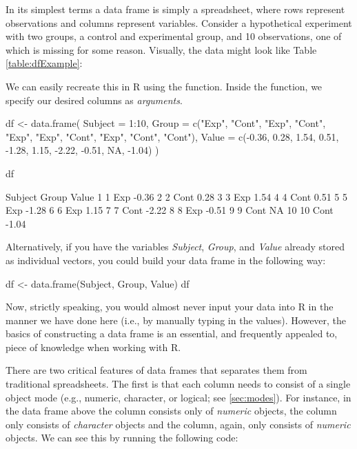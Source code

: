 In its simplest terms a data frame is simply a spreadsheet, where rows represent observations and columns represent variables. Consider a hypothetical experiment with two groups, a control and experimental group, and 10 observations, one of which is missing for some reason. Visually, the data might look like Table \ref{table:dfExample}: 

\medskip



\noindent
We can easily recreate this in R using the  function. Inside the function, we specify our desired columns as \textit{arguments}.

\begin{inR}
df <- data.frame(
  Subject = 1:10,
  Group = c("Exp", "Cont", "Exp", "Cont", "Exp", "Exp",
            "Cont", "Exp", "Cont", "Cont"),
  Value = c(-0.36,  0.28,  1.54,  0.51, -1.28,  1.15,
            -2.22, -0.51,  NA, -1.04)
)

df
\end{inR}
\begin{outR}
   Subject Group Value
1        1   Exp -0.36
2        2  Cont  0.28
3        3   Exp  1.54
4        4  Cont  0.51
5        5   Exp -1.28
6        6   Exp  1.15
7        7  Cont -2.22
8        8   Exp -0.51
9        9  Cont    NA
10      10  Cont -1.04
\end{outR}

\noindent
Alternatively, if you have the variables \textit{Subject}, \textit{Group}, and \textit{Value} already stored as individual vectors, you could build your data frame in the following way:

\begin{inR}
df <- data.frame(Subject, Group, Value)
df
\end{inR}

Now, strictly speaking, you would almost never input your data into R in the manner we have done here (i.e., by manually typing in the values). However, the basics of constructing a data frame is an essential, and frequently appealed to, piece of knowledge when working with R.

There are two critical features of data frames that separates them from traditional spreadsheets.  The first is that each column needs to consist of a single object mode (e.g., numeric, character, or logical; see \ref{sec:modes}). For instance, in the data frame above the  column consists only of \textit{numeric} objects, the  column only consists of \textit{character} objects and the  column, again, only consists of \textit{numeric} objects. We can see this by running the following code:

